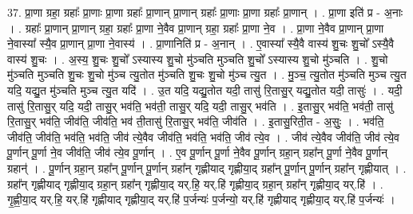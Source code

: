 \documentclass[17pt]{extarticle}
\begin{document}
37. प्रा॒णा ग्रहा॒ ग्रहाः᳚ प्रा॒णाः प्रा॒णा ग्रहाः᳚ प्रा॒णान् प्रा॒णान् ग्रहाः᳚ प्रा॒णाः प्रा॒णा ग्रहाः᳚ प्रा॒णान् । . प्रा॒णा इति॑ प्र - अ॒नाः । . ग्रहाः᳚ प्रा॒णान् प्रा॒णान् ग्रहा॒ ग्रहाः᳚ प्रा॒णा ने॒वैव प्रा॒णान् ग्रहा॒ ग्रहाः᳚ प्रा॒णा ने॒व । . प्रा॒णा ने॒वैव प्रा॒णान् प्रा॒णा ने॒वास्या᳚ स्यै॒व प्रा॒णान् प्रा॒णा ने॒वास्य॑ । . प्रा॒णानिति॑ प्र - अ॒नान् । . ए॒वास्या᳚ स्यै॒वै वास्य॑ शु॒चः शु॒चो᳚ ऽस्यै॒वै वास्य॑ शु॒चः । . अ॒स्य॒ शु॒चः शु॒चो᳚ ऽस्यास्य शु॒चो मु॑ञ्चति मुञ्चति शु॒चो᳚ ऽस्यास्य शु॒चो मु॑ञ्चति । . शु॒चो मु॑ञ्चति मुञ्चति शु॒चः शु॒चो मु॑ञ्च त्यु॒तोत मु॑ञ्चति शु॒चः शु॒चो मु॑ञ्च त्यु॒त । . मु॒ञ्च॒ त्यु॒तोत मु॑ञ्चति मुञ्च त्यु॒त यदि॒ यद्यु॒त मु॑ञ्चति मुञ्च त्यु॒त यदि॑ । . उ॒त यदि॒ यद्यु॒तोत यदी॒ तासु॑ रि॒तासु॒र् यद्यु॒तोत यदी॒ तासुः॑ । . यदी॒ तासु॑ रि॒तासु॒र् यदि॒ यदी॒ तासु॒र् भव॑ति॒ भव॑ती॒ तासु॒र् यदि॒ यदी॒ तासु॒र् भव॑ति । . इ॒तासु॒र् भव॑ति॒ भव॑ती॒ तासु॑ रि॒तासु॒र् भव॑ति॒ जीव॑ति॒ जीव॑ति॒ भव॑ ती॒तासु॑ रि॒तासु॒र् भव॑ति॒ जीव॑ति । . इ॒तासु॒रिती॒त - अ॒सुः॒ । . भव॑ति॒ जीव॑ति॒ जीव॑ति॒ भव॑ति॒ भव॑ति॒ जीव॑ त्ये॒वैव जीव॑ति॒ भव॑ति॒ भव॑ति॒ जीव॑ त्ये॒व । . जीव॑ त्ये॒वैव जीव॑ति॒ जीव॑ त्ये॒व पू॒र्णान् पू॒र्णा ने॒व जीव॑ति॒ जीव॑ त्ये॒व पू॒र्णान् । . ए॒व पू॒र्णान् पू॒र्णा ने॒वैव पू॒र्णान् ग्रहा॒न् ग्रहा᳚न् पू॒र्णा ने॒वैव पू॒र्णान् ग्रहान्॑ । . पू॒र्णान् ग्रहा॒न् ग्रहा᳚न् पू॒र्णान् पू॒र्णान् ग्रहा᳚न् गृह्णीयाद् गृह्णीया॒द् ग्रहा᳚न् पू॒र्णान् पू॒र्णान् ग्रहा᳚न् गृह्णीयात् । . ग्रहा᳚न् गृह्णीयाद् गृह्णीया॒द् ग्रहा॒न् ग्रहा᳚न् गृह्णीया॒द् यर्.हि॒ यर्.हि॑ गृह्णीया॒द् ग्रहा॒न् ग्रहा᳚न् गृह्णीया॒द् यर्.हि॑ । . गृ॒ह्णी॒या॒द् यर्.हि॒ यर्.हि॑ गृह्णीयाद् गृह्णीया॒द् यर्.हि॑ प॒र्जन्यः॑ प॒र्जन्यो॒ यर्.हि॑ गृह्णीयाद् गृह्णीया॒द् यर्.हि॑ प॒र्जन्यः॑ । \newline
\end{document}
